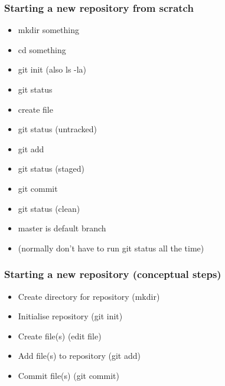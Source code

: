 \documentclass{git_course}
\begin{document}
\begin{frame}
\frametitle{Starting a new repository from scratch}
\begin{itemize}
    \item mkdir something
    \item cd something
    \item git init  (also ls -la)
    \item git status
    \item create file
    \item git status (untracked)
    \item git add
    \item git status (staged)
    \item git commit
    \item git status (clean)
    \item master is default branch
    \item (normally don't have to run git status all the time)
\end{itemize}
\end{frame}

\begin{frame}
    \frametitle{Starting a new repository (conceptual steps)}
    \begin{itemize}
        \item Create directory for repository (mkdir)
        \item Initialise repository (git init)
        \item Create file(s) (edit file)
        \item Add file(s) to repository (git add)
        \item Commit file(s) (git commit)
    \end{itemize}
\end{frame}
\end{document}
